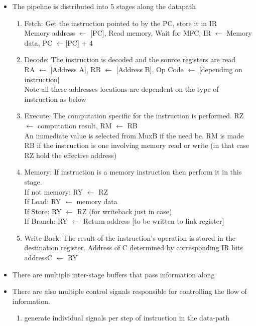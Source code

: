 \documentclass[10pt]{article}
\begin{document}
\begin{itemize}
    \item The pipeline is distributed into 5 stages along the datapath
    \begin{enumerate}
        \item Fetch: Get the instruction pointed to by the PC, store it in IR\\
        Memory address $\leftarrow$ [PC], Read memory, Wait for MFC, IR $\leftarrow$ Memory data, PC $\leftarrow$[PC] + 4
        \item Decode: The instruction is decoded and the source registers are read\\
        RA $\leftarrow$ [Address A],
        RB $\leftarrow$ [Address B],
        Op Code $\leftarrow$ [depending on instruction]\\
        Note all these addresses locations are dependent on the type of instruction as below
        \item Execute: The computation specific for the instruction is performed.
        RZ $\leftarrow$ computation result, RM $\leftarrow$ RB\\
        An immediate value is selected from MuxB if the need be. RM is made RB if the instruction is one involving memory read or write (in that case RZ hold the effective address)
        \item Memory:  If instruction is a memory instruction then perform it in this stage. \\
        If not memory: RY $\leftarrow$ RZ\\
        If Load: RY $\leftarrow$ memory data\\
        If Store: RY $\leftarrow$ RZ (for writeback just in case)\\
        If Branch: RY $\leftarrow$ Return address [to be written to link register]
        \item Write-Back: The result of the instruction’s operation is stored in the destination register. Address of C determined by corresponding IR bits\\
        addressC $\leftarrow$ RY
    \end{enumerate}
    \item There are multiple inter-stage buffers that pass information along
    \item There are also multiple control signals responsible for controlling the flow of information.
    \begin{enumerate}
        \item generate individual signals per step of instruction in the data-path

\end{enumerate}
\end{itemize}
\end{document}
